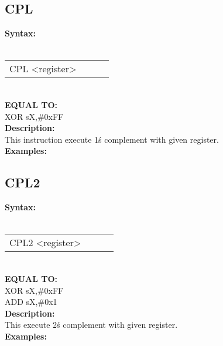                 \subsection{CPL}
                \textbf{Syntax:}\\
                \\ {
                    \texttt{}
                    \begin{tabular}[h!]{llll}
                            { \color{highlight_instruction} CPL    } { \color{highlight_symbol} <register> }
                            { \color{highlight_comment}  }\\
                    \end{tabular}
                    }\\
                    \textbf{EQUAL TO:}\\
                    { \color{highlight_instruction} XOR    } { \color{highlight_symbol}      sX,\#0xFF }
                    \\
                \textbf{Description:}\\
                This instruction execute 1\'s complement with given register.\\
                \textbf{Examples:}\\
                        \begin{code}[h!]
                            symbol}\verb'CPL          s0' }\\
                        \end{code}
                \subsection{CPL2}
                \textbf{Syntax:}\\
                \\ {
                    \texttt{}
                    \begin{tabular}[h!]{llll}
                            { \color{highlight_instruction} CPL2    } { \color{highlight_symbol} <register> }
                            { \color{highlight_comment}  }\\
                    \end{tabular}
                    }\\
                    \textbf{EQUAL TO:}\\
                    { \color{highlight_instruction} XOR    } { \color{highlight_symbol}      sX,\#0xFF }\\
                    { \color{highlight_instruction} ADD    } { \color{highlight_symbol}      sX,\#0x1 }\\
                \textbf{Description:}\\
                This execute 2\'s complement with given register.\\
                \textbf{Examples:}\\
                        \begin{code}[h!]
                            symbol}\verb'CPL2          s0' }\\
                        \end{code}


